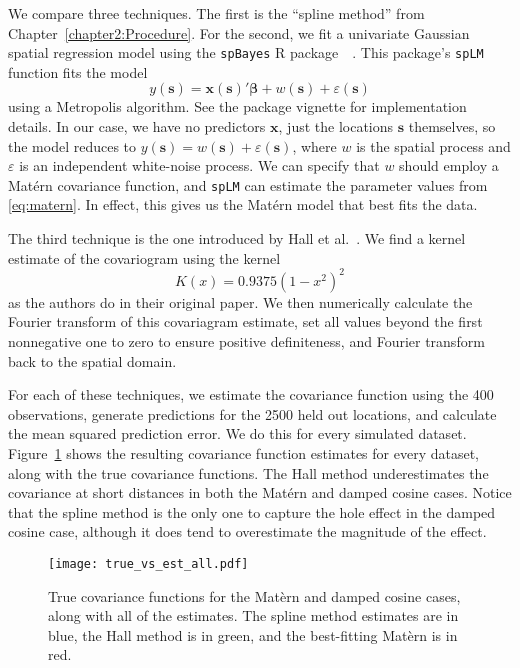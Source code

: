 We compare three techniques. The first is the ``spline method'' from Chapter~\ref{chapter2:Procedure}. For the second, we fit a univariate Gaussian spatial regression model using the \texttt{spBayes} R package~\cite{spBayes1}~\cite{spBayes2}. This package's \texttt{spLM} function fits the model
\[
	y(\bm{s}) = \bm{x}(\bm{s})'\bm{\beta} + w(\bm{s}) + \varepsilon(\bm{s})
\]
using a Metropolis algorithm. See the package vignette for implementation details. In our case, we have no predictors $\bm{x}$, just the locations $\bm{s}$ themselves, so the model reduces to $y(\bm{s}) = w(\bm{s}) + \varepsilon(\bm{s})$, where $w$ is the spatial process and $\varepsilon$ is an independent white-noise process. We can specify that $w$ should employ a Mat\'{e}rn covariance function, and \texttt{spLM} can estimate the parameter values from \eqref{eq:matern}. In effect, this gives us the Mat\'{e}rn model that best fits the data.

The third technique is the one introduced by Hall et al.~\cite{Hall1994}. We find a kernel estimate of the covariogram using the kernel
\[
	K(x) = 0.9375(1 - x^2)^2
\]
as the authors do in their original paper. We then numerically calculate the Fourier transform of this covariagram estimate, set all values beyond the first nonnegative one to zero to ensure positive definiteness, and Fourier transform back to the spatial domain.

For each of these techniques, we estimate the covariance function using the 400 observations, generate predictions for the 2500 held out locations, and calculate the mean squared prediction error. We do this for every simulated dataset. Figure~\ref{fig:true-vs-est-all} shows the resulting covariance function estimates for every dataset, along with the true covariance functions. The Hall method underestimates the covariance at short distances in both the Mat\'{e}rn and damped cosine cases. Notice that the spline method is the only one to capture the hole effect in the damped cosine case, although it does tend to overestimate the magnitude of the effect.

\begin{figure}[htbp]
	\centering
	\texttt{[image: true\_vs\_est\_all.pdf]}
	\caption{True covariance functions for the Mat\`{e}rn and damped cosine cases, along with all of the estimates. The spline method estimates are in blue, the Hall method is in green, and the best-fitting Mat\`{e}rn is in red.}
	\label{fig:true-vs-est-all}
\end{figure}

